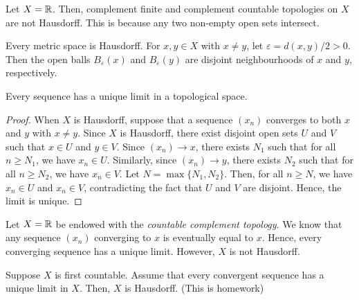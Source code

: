 \begin{example}
    Let $X=\mathbb{R}$. Then, complement finite and complement countable topologies on $X$ are not Hausdorff. This is because any two non-empty open sets intersect.
\end{example}

\begin{example}
    Every metric space is Hausdorff. For \(x,y\in X\) with \(x\neq y\), let \(\varepsilon=d(x,y)/2>0\). Then the open balls \(B_\varepsilon(x)\) and \(B_\varepsilon(y)\) are disjoint neighbourhoods of \(x\) and \(y\), respectively.
\end{example}

\begin{proposition}
    Every sequence has a unique limit in a topological space.
\end{proposition}
\begin{proof}
    When $X$ is Hausdorff, suppose that a sequence $(x_n)$ converges to both $x$ and $y$ with $x\neq y$. Since $X$ is Hausdorff, there exist disjoint open sets $U$ and $V$ such that $x\in U$ and $y\in V$. Since $(x_n)\to x$, there exists $N_1$ such that for all $n\ge N_1$, we have $x_n\in U$. Similarly, since $(x_n)\to y$, there exists $N_2$ such that for all $n\ge N_2$, we have $x_n\in V$. Let $N=\max\{N_1,N_2\}$. Then, for all $n\ge N$, we have $x_n\in U$ and $x_n\in V$, contradicting the fact that $U$ and $V$ are disjoint. Hence, the limit is unique.
\end{proof}


\begin{example}
Let $X=\mathbb{R}$ be endowed with the 
\emph{countable complement topology}. We know that any sequence $(x_n)$ converging to $x$ is eventually equal to $x$. Hence, every converging sequence has a unique limit. However, $X$ is not Hausdorff.
\end{example}

\begin{theorem}
    Suppose $X$ is first countable. Assume that every convergent sequence has a unique limit in $X$. Then, $X$ is Hausdorff. (This is homework)
\end{theorem}

